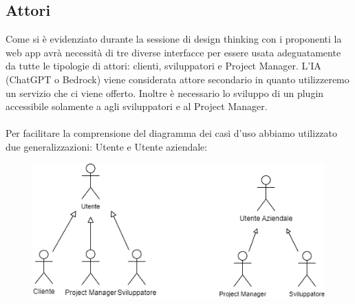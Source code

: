 \documentclass{article}
\begin{document}
\subsection*{Attori}
Come si è evidenziato durante la sessione di design thinking con i proponenti la web app avrà necessità di tre diverse interfacce per essere usata adeguatamente da tutte le tipologie di attori: clienti, sviluppatori e Project Manager. L'IA (ChatGPT o Bedrock) viene considerata attore secondario in quanto utilizzeremo un servizio che ci viene offerto. Inoltre è necessario lo sviluppo di un plugin accessibile solamente a agli sviluppatori e al Project Manager.\\\\

Per facilitare la comprensione del diagramma dei casi d'uso abbiamo utilizzato due generalizzazioni: Utente e Utente aziendale: 

\begin{figure}[h]
    \centering
    \includegraphics{documenti/imgUML/Attori.png}
    \label{fig:immagine}
\end{figure}
\end{document}
